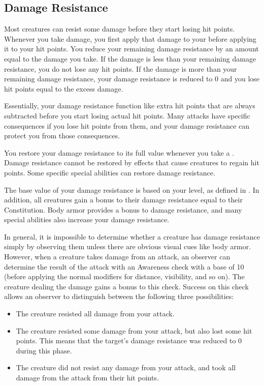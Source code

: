     \subsection{Damage Resistance}\label{Damage Resistance}
        Most creatures can resist some damage before they start losing hit points.
        Whenever you take damage, you first apply that damage to your  before applying it to your hit points.
        You reduce your remaining damage resistance by an amount equal to the damage you take.
        If the damage is less than your remaining damage resistance, you do not lose any hit points.
        If the damage is more than your remaining damage resistance, your damage resistance is reduced to 0 and you lose hit points equal to the excess damage.

        Essentially, your damage resistance function like extra hit points that are always subtracted before you start losing actual hit points.
        Many attacks have specific consequences if you lose hit points from them, and your damage resistance can protect you from those consequences.

        You restore your damage resistance to its full value whenever you take a .
        Damage resistance cannot be restored by effects that cause creatures to regain hit points.
        Some specific special abilities can restore damage resistance.

        The base value of your damage resistance is based on your level, as defined in .
        In addition, all creatures gain a bonus to their damage resistance equal to their Constitution.
        Body armor provides a bonus to damage resistance, and many special abilities also increase your damage resistance.

        In general, it is impossible to determine whether a creature has damage resistance simply by observing them unless there are obvious visual cues like body armor.
        However, when a creature takes damage from an attack, an observer can determine the result of the attack with an Awareness check with a base  of 10 (before applying the normal modifiers for distance, visibility, and so on).
        The creature dealing the damage gains a  bonus to this check.
        Success on this check allows an observer to distinguish between the following three possibilities:
        \begin{itemize}
            \item The creature resisted all damage from your attack.
            \item The creature resisted some damage from your attack, but also lost some hit points.
                This means that the target's damage resistance was reduced to 0 during this phase.
            \item The creature did not resist any damage from your attack, and took all damage from the attack from their hit points.
        \end{itemize}

